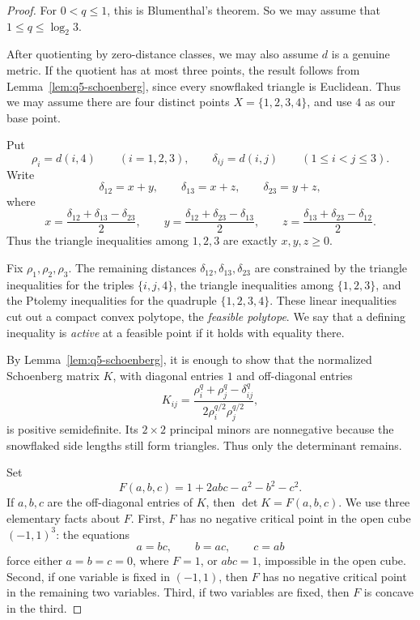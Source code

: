 \documentclass[12pt]{amsart}
\theoremstyle{definition}
\newcommand{\1}{\mathbf{1}}
\begin{document}
\begin{proof}
For $0<q\le1$, this is Blumenthal's theorem. So we may assume that $1\le q\le\log_2 3$.

After quotienting by zero-distance classes, we may also assume $d$ is a genuine metric.  If the
quotient has at most three points, the result follows from Lemma~\ref{lem:q5-schoenberg},
since every snowflaked triangle is Euclidean.  Thus we may assume there are four distinct
points $X=\{1,2,3,4\}$, and use $4$ as our base point.  

Put
\[
        \rho_i=d(i,4)\qquad (i=1,2,3),
        \qquad
        \delta_{ij}=d(i,j)\qquad (1\le i<j\le3).
\]
Write
\[
        \delta_{12}=x+y,\qquad
        \delta_{13}=x+z,\qquad
        \delta_{23}=y+z,
\]
where
\[
        x=\frac{\delta_{12}+\delta_{13}-\delta_{23}}2,\qquad
        y=\frac{\delta_{12}+\delta_{23}-\delta_{13}}2,\qquad
        z=\frac{\delta_{13}+\delta_{23}-\delta_{12}}2.
\]
Thus the triangle inequalities among $1,2,3$ are exactly $x,y,z\ge0$.

Fix $\rho_1,\rho_2,\rho_3$.  The remaining distances
$\delta_{12},\delta_{13},\delta_{23}$ are constrained by the triangle inequalities
for the triples $\{i,j,4\}$, the triangle inequalities among $\{1,2,3\}$, and the
Ptolemy inequalities for the quadruple $\{1,2,3,4\}$.  These linear inequalities cut
out a compact convex polytope, the \emph{feasible polytope}.  We say that a defining inequality is
\emph{active} at a feasible point if it holds with equality there.

By Lemma~\ref{lem:q5-schoenberg}, it is enough to show that the normalized
Schoenberg matrix $K$, with diagonal entries $1$ and off-diagonal entries
\[
        K_{ij}=\frac{\rho_i^q+\rho_j^q-\delta_{ij}^q}
        {2\rho_i^{q/2}\rho_j^{q/2}},
\]
is positive semidefinite.  Its $2\times2$ principal minors are nonnegative because
the snowflaked side lengths still form triangles.  Thus only the determinant remains.

Set
\[
        F(a,b,c)=1+2abc-a^2-b^2-c^2.
\]
If $a,b,c$ are the off-diagonal entries of $K$, then $\det K=F(a,b,c)$.
We use three elementary facts about $F$.  First, $F$ has no negative critical point
in the open cube $(-1,1)^3$: the equations
\[
        a=bc,\qquad b=ac,\qquad c=ab
\]
force either $a=b=c=0$, where $F=1$, or $abc=1$, impossible in the open cube.
Second, if one variable is fixed in $(-1,1)$, then $F$ has no negative critical
point in the remaining two variables.  Third, if two variables are fixed, then $F$
is concave in the third.


\end{proof}
\end{document}
